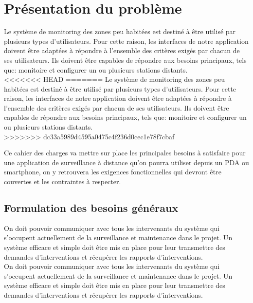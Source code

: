 
\section{Présentation du problème}


Le système de monitoring des zones peu habitées est destiné à être utilisé par plusieurs types 
d'utilisateurs. Pour cette raison, les interfaces de notre application doivent être adaptées à 
répondre à l'ensemble des critères exigés par chacun de ses utilisateurs.
Ils doivent être capables de répondre aux besoins principaux, tels que: monitoire et configurer 
un ou plusieurs stations distants.\\

<<<<<<< HEAD
=======
Le système de monitoring des zones peu habitées est destiné à être utilisé
par plusieurs types d'utilisateurs. Pour cette raison, les interfaces de
notre application doivent être adaptées à répondre à l'ensemble des
critères exigés par chacun de ses utilisateurs. Ils doivent être capables
de répondre aux besoins principaux, tels que: monitoire et configurer un ou
plusieurs stations distants.\\

>>>>>>> dc33a5989d4595a0475c4f236d0cec1e78f7cbaf

Ce cahier des charges va mettre sur place les principales besoins à satisfaire pour une application 
de surveillance à distance qu'on pourra utiliser depuis un PDA ou smartphone, on y retrouvera les exigences 
fonctionnelles qui devront être couvertes et les contraintes à respecter.


\subsection{Formulation des besoins généraux}


On doit pouvoir communiquer avec tous les intervenants du système qui s'occupent actuellement de 
la surveillance et maintenance dans le projet. Un système efficace et simple doit être mis en place 
pour leur transmettre des demandes d'interventions et récupérer les rapports d'interventions.\\

On doit pouvoir communiquer avec tous les intervenants du système qui s'occupent actuellement de la surveillance et maintenance dans le projet. Un système efficace et simple doit être mis en place pour leur transmettre des demandes d'interventions et récupérer les rapports d'interventions.\\



